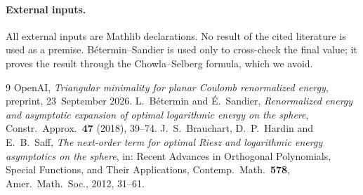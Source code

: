 \documentclass[11pt]{article}
\theoremstyle{definition}
\theoremstyle{remark}
\begin{document}
\paragraph{External inputs.} All external inputs are Mathlib declarations. No result of the cited literature is used
as a premise. B\'etermin--Sandier \cite[\S7.3]{BeterminSandier2018} is used only to cross-check the
final value; it proves the result through the Chowla--Selberg formula, which we avoid.

\begin{thebibliography}{9}
 OpenAI, \emph{Triangular minimality for planar Coulomb renormalized energy}, preprint, 23~September 2026.
 L.~B\'etermin and \'E.~Sandier, \emph{Renormalized energy and asymptotic expansion of optimal
logarithmic energy on the sphere}, Constr.\ Approx.\ \textbf{47} (2018), 39--74.
 J.~S.~Brauchart, D.~P.~Hardin and E.~B.~Saff, \emph{The next-order term for optimal Riesz and
logarithmic energy asymptotics on the sphere}, in: Recent Advances in Orthogonal Polynomials, Special Functions, and Their
Applications, Contemp.\ Math.\ \textbf{578}, Amer.\ Math.\ Soc., 2012, 31--61.
\end{thebibliography}
\end{document}
